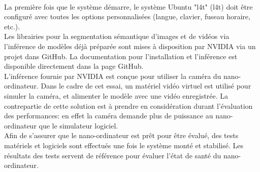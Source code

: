 \vspace{0.5\baselineskip}
\\
\noindent La première fois que le système démarre, le système Ubuntu "\acrlong{l4t}" (\acrshort{l4t}) doit être configuré avec toutes les options personnalisées (langue, clavier, fuseau horaire, etc.).
\vspace{0.5\baselineskip}
\\
\noindent Les librairies pour la segmentation sémantique 
d'images et de vidéos via l'inférence de modèles déjà préparée sont mises à disposition par NVIDIA via un projet dans GitHub. La documentation pour l'installation et l'inférence est disponible directement dans la page GitHub. 
\vspace{0.5\baselineskip}
\\
\noindent L'inférence fournie par NVIDIA est conçue pour utiliser la caméra du nano-ordinateur. Dans le cadre de cet essai, un matériel vidéo virtuel est utilisé pour simuler la caméra, et alimenter le modèle avec une vidéo enregistrée. La contrepartie de cette solution est à prendre en considération durant l'évaluation des performances: en effet la caméra demande plus de puissance au nano-ordinateur que le simulateur logiciel.
\vspace{0.5\baselineskip}
\\
\noindent Afin de s'assurer que le nano-ordinateur est prêt pour être évalué, des tests matériels et logiciels sont effectués une fois le système monté et stabilisé. Les résultats des tests servent de référence pour évaluer l'état de santé du nano-ordinateur. 